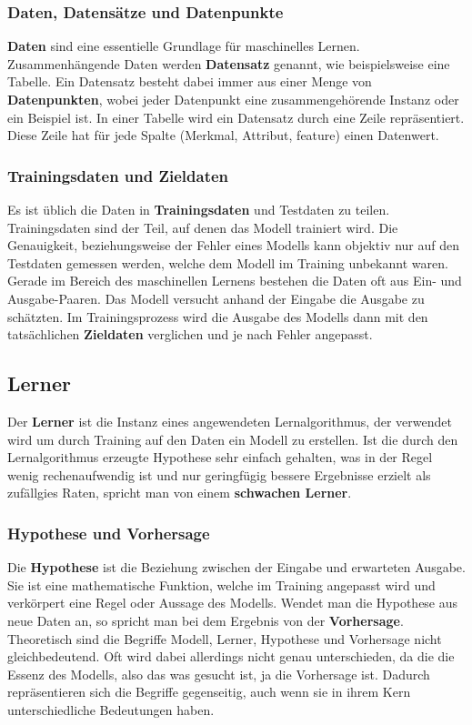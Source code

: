 \subsubsection{Daten, Datensätze und Datenpunkte}
\textbf{Daten} sind eine essentielle Grundlage für maschinelles Lernen. Zusammenhängende Daten werden \textbf{Datensatz} genannt, wie beispielsweise eine Tabelle. Ein Datensatz besteht dabei immer aus einer Menge von \textbf{Datenpunkten}, wobei jeder Datenpunkt eine zusammengehörende Instanz oder ein Beispiel ist. In einer Tabelle wird ein Datensatz durch eine Zeile repräsentiert. Diese Zeile hat für jede Spalte (Merkmal, Attribut, feature) einen Datenwert.

\subsubsection{Trainingsdaten und Zieldaten}
Es ist üblich die Daten in \textbf{Trainingsdaten} und Testdaten zu teilen. Trainingsdaten sind der Teil, auf denen das Modell trainiert wird. Die Genauigkeit, beziehungsweise der Fehler eines Modells kann objektiv nur auf den Testdaten gemessen werden, welche dem Modell im Training unbekannt waren.
\newline
Gerade im Bereich des maschinellen Lernens bestehen die Daten oft aus Ein- und Ausgabe-Paaren. Das Modell versucht anhand der Eingabe die Ausgabe zu schätzten. Im Trainingsprozess wird die Ausgabe des Modells dann mit den tatsächlichen \textbf{Zieldaten} verglichen und je nach Fehler angepasst.

\subsection{Lerner}
Der \textbf{Lerner} ist die Instanz eines angewendeten Lernalgorithmus, der verwendet wird um durch Training auf den Daten ein Modell zu erstellen. Ist die durch den Lernalgorithmus erzeugte Hypothese sehr einfach gehalten, was in der Regel wenig rechenaufwendig ist und nur geringfügig bessere Ergebnisse erzielt als zufällgies Raten, spricht man von einem \textbf{schwachen Lerner}.

\subsubsection{Hypothese und Vorhersage}
Die \textbf{Hypothese} ist die Beziehung zwischen der Eingabe und erwarteten Ausgabe. Sie ist eine mathematische Funktion, welche im Training angepasst wird und verkörpert  eine Regel oder Aussage des Modells. 
\newline
Wendet man die Hypothese aus neue Daten an, so spricht man bei dem Ergebnis von der \textbf{Vorhersage}.
\newline
Theoretisch sind die Begriffe Modell, Lerner, Hypothese und Vorhersage nicht gleichbedeutend. Oft wird dabei allerdings nicht genau unterschieden, da die die Essenz des Modells, also das was gesucht ist, ja die Vorhersage ist. Dadurch repräsentieren sich die Begriffe gegenseitig, auch wenn sie in ihrem Kern unterschiedliche Bedeutungen haben.

